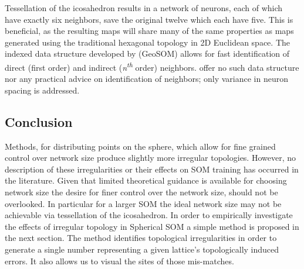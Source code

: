 \documentclass[12pt]{article}
\begin{document}
Tessellation of the icosahedron results in a network of neurons, each of which
have exactly six neighbors, save the original twelve which each have five.
This is beneficial, as the resulting maps will share many of the same
properties as maps generated using the traditional hexagonal topology in 2D
Euclidean space. The indexed data structure developed by
\citeauthor{Wu:2006lr} (GeoSOM) allows for fast identification of direct
(first order) and indirect (\textit{n\textsuperscript{th}} order) neighbors.
\cite{Nishio:2006fk} offer no such data structure nor any practical advice on
identification of neighbors; only variance in neuron spacing is addressed.

\subsection{Conclusion}
Methods, for distributing points on the sphere, which allow for fine grained 
control over network size produce slightly more irregular topologies.  However,
no description of these irregularities or their effects on SOM training has occurred in the
literature. Given that limited theoretical guidance is available for choosing network size the
desire for finer control over the network size, should not be overlooked. In
particular for a larger SOM the ideal network size may not be achievable via
tessellation of the icosahedron. In order to empirically investigate the effects of irregular 
topology in Spherical SOM a simple method is proposed in the next section.  The method
identifies topological irregularities in order to generate a single number representing a
given lattice's topologically induced errors.  It also allows us to visual the sites of those mis-matches.

\end{document}

